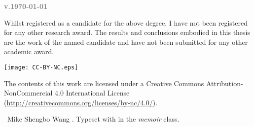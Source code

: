 %

\clearpage
\thispagestyle{empty}

\hypertarget{colophon}{}

\begin{colophon}

\ifdraftdoc
	\textcolor{gray}{\textbf{\ttfamily\bfseries v.\today}}
	\vfill
\else
    \null\vfill
\fi

\begin{minipage}{\textwidth}
    Whilst registered as a candidate for the above degree, I have not been registered for any other research award. The results and conclusions embodied in this thesis are the work of the named candidate and have not been submitted for any other academic award.

    \bigskip

    {}

    \bigskip\bigskip\bigskip

    \newdimen\licencewidth

    \begin{minipage}[c]{\licencewidth}
        \vspace{-3pt}\texttt{[image: CC-BY-NC.eps]}
    \end{minipage}%
    \hspace{1em}%
    \begin{minipage}{\textwidth-\licencewidth-1em}
        The contents of this work are licensed under a Creative Commons Attribution-NonCommercial 4.0 International License (\url{http://creativecommons.org/licenses/by-nc/4.0/}).
    \end{minipage}%
    \par

    \bigskip\smallskip

    \textcopyright\ Mike Shengbo Wang \copyrightyear. Typeset with {\XeLaTeX} in the \textit{memoir} class.
\end{minipage}

\end{colophon}

\clearpage

